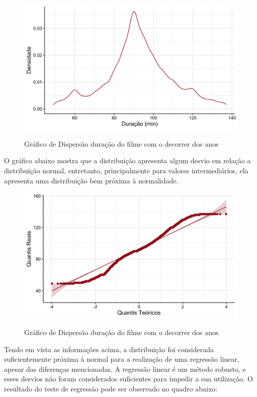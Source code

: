 \documentclass[a4paper, 12pt]{article} %
\begin{document}
\begin{figure}[H]
    \centering
    \caption{Gráfico de Dispersão duração do filme com o decorrer dos anos}
    \includegraphics[scale=0.15]{Fig_Duracao_Densidade.png}
    \label{fig:my_label}
\end{figure}

O gráfico abaixo mostra que a distribuição apresenta algum desvio em relação a distribuição normal, entretanto, principalmente para valores intermediários, ela apresenta uma distribuição bem próxima à normalidade. 

\begin{figure}[H]
    \centering
    \caption{Gráfico de Dispersão duração do filme com o decorrer dos anos}
    \includegraphics[scale=0.15]{Fig_Duracao_QQ.png}
    \label{fig:my_label}
\end{figure}

Tendo em vista as informações acima, a distribuição foi considerada suficientemente próxima à normal para a realização de uma regressão linear, apesar das diferenças mencionadas. A regressão linear é um método robusto, e esses desvios não foram considerados suficientes para impedir a sua utilização. O resultado do teste de regressão pode ser observado no quadro abaixo:
\end{document}
